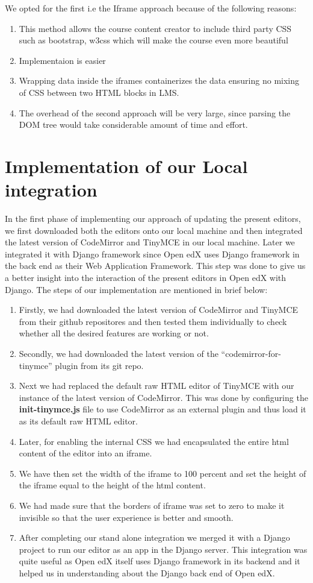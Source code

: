 We opted for the first i.e the Iframe approach because of the following reasons:
\begin{enumerate}
\item This method allows the course content creator to include third party CSS such as
bootstrap, w3css which will make the course even more beautiful
\item Implementaion is easier
\item Wrapping data inside the iframes containerizes the data ensuring no mixing of
CSS between two HTML blocks in LMS.
\item The overhead of the second approach will be very large, since parsing
the DOM tree would take considerable amount of time and effort.
\end{enumerate}


\section{Implementation of our Local integration}
In the first phase of implementing our approach of updating the present editors, we
first downloaded both the editors onto our local machine and then integrated the latest
version of CodeMirror and TinyMCE in our local machine. Later we integrated it with
Django framework since Open edX uses Django framework in the back end as their Web
Application Framework. This step was done to give us a better insight into the interaction of
the present editors in Open edX with Django. The steps of our implementation are
mentioned in brief below:
\begin{enumerate}
\item Firstly, we had downloaded the latest version of CodeMirror and TinyMCE from their
github repositores and then tested them individually to check whether all the desired features
are working or not.
\item Secondly, we had downloaded the latest version of the “codemirror-for-tinymce” plugin
from its git repo.
\item Next we had replaced the default raw HTML editor of TinyMCE with our instance of the
latest version of CodeMirror. This was done by configuring the \textbf{init-tinymce.js} file to use
CodeMirror as an external plugin and thus load it as its default raw HTML editor.
\item Later, for enabling the internal CSS we had encapsulated the entire html content of the
editor into an iframe.
\item We have then set the width of the iframe to 100 percent and set the height of the iframe
equal to the height of the html content.
\item  We had made sure that the borders of iframe was set to zero to make it invisible so that
the user experience is better and smooth.
\item After completing our stand alone integration we merged it with a Django project to run
our editor as an app in the Django server. This integration was quite useful as Open edX
itself uses Django framework in its backend and it helped us in understanding about the
Django back end of Open edX.
\end{enumerate}


